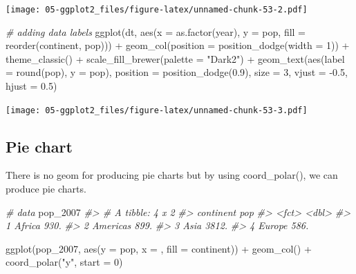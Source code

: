 \documentclass[
]{book}
\newenvironment{Shaded}{\begin{snugshade}}{\end{snugshade}}
\newcommand{\AttributeTok}[1]{\textcolor[rgb]{0.77,0.63,0.00}{#1}}
\newcommand{\CommentTok}[1]{\textcolor[rgb]{0.56,0.35,0.01}{\textit{#1}}}
\newcommand{\DecValTok}[1]{\textcolor[rgb]{0.00,0.00,0.81}{#1}}
\newcommand{\FloatTok}[1]{\textcolor[rgb]{0.00,0.00,0.81}{#1}}
\newcommand{\FunctionTok}[1]{\textcolor[rgb]{0.00,0.00,0.00}{#1}}
\newcommand{\NormalTok}[1]{#1}
\newcommand{\SpecialCharTok}[1]{\textcolor[rgb]{0.00,0.00,0.00}{#1}}
\newcommand{\StringTok}[1]{\textcolor[rgb]{0.31,0.60,0.02}{#1}}
\begin{document}
\texttt{[image: 05-ggplot2\_files/figure-latex/unnamed-chunk-53-2.pdf]}

\begin{Shaded}
\begin{Highlighting}[]


\CommentTok{\# adding data labels}
\FunctionTok{ggplot}\NormalTok{(dt, }\FunctionTok{aes}\NormalTok{(}\AttributeTok{x =} \FunctionTok{as.factor}\NormalTok{(year), }\AttributeTok{y =}\NormalTok{ pop, }\AttributeTok{fill =} \FunctionTok{reorder}\NormalTok{(continent, pop))) }\SpecialCharTok{+} 
   \FunctionTok{geom\_col}\NormalTok{(}\AttributeTok{position =} \FunctionTok{position\_dodge}\NormalTok{(}\AttributeTok{width =} \DecValTok{1}\NormalTok{)) }\SpecialCharTok{+}
   \FunctionTok{theme\_classic}\NormalTok{() }\SpecialCharTok{+}
   \FunctionTok{scale\_fill\_brewer}\NormalTok{(}\AttributeTok{palette =} \StringTok{"Dark2"}\NormalTok{) }\SpecialCharTok{+}
   \FunctionTok{geom\_text}\NormalTok{(}\FunctionTok{aes}\NormalTok{(}\AttributeTok{label =} \FunctionTok{round}\NormalTok{(pop), }\AttributeTok{y =}\NormalTok{ pop), }\AttributeTok{position =} \FunctionTok{position\_dodge}\NormalTok{(}\FloatTok{0.9}\NormalTok{), }
             \AttributeTok{size =} \DecValTok{3}\NormalTok{, }\AttributeTok{vjust =} \SpecialCharTok{{-}}\FloatTok{0.5}\NormalTok{, }\AttributeTok{hjust =} \FloatTok{0.5}\NormalTok{)}
\end{Highlighting}
\end{Shaded}

\texttt{[image: 05-ggplot2\_files/figure-latex/unnamed-chunk-53-3.pdf]}

\hypertarget{pie-chart}{%
\subsection{Pie chart}\label{pie-chart}}

There is no geom for producing pie charts but by using coord\_polar(), we can produce pie charts.

\begin{Shaded}
\begin{Highlighting}[]
\CommentTok{\# data}
\NormalTok{pop\_2007}
\CommentTok{\#\textgreater{} \# A tibble: 4 x 2}
\CommentTok{\#\textgreater{}   continent   pop}
\CommentTok{\#\textgreater{}   \textless{}fct\textgreater{}     \textless{}dbl\textgreater{}}
\CommentTok{\#\textgreater{} 1 Africa     930.}
\CommentTok{\#\textgreater{} 2 Americas   899.}
\CommentTok{\#\textgreater{} 3 Asia      3812.}
\CommentTok{\#\textgreater{} 4 Europe     586.}

\FunctionTok{ggplot}\NormalTok{(pop\_2007, }\FunctionTok{aes}\NormalTok{(}\AttributeTok{y =}\NormalTok{ pop, }\AttributeTok{x =} \StringTok{\textquotesingle{}\textquotesingle{}}\NormalTok{, }\AttributeTok{fill =}\NormalTok{ continent)) }\SpecialCharTok{+} 
   \FunctionTok{geom\_col}\NormalTok{() }\SpecialCharTok{+}
   \FunctionTok{coord\_polar}\NormalTok{(}\StringTok{"y"}\NormalTok{, }\AttributeTok{start =} \DecValTok{0}\NormalTok{)}
\end{Highlighting}
\end{Shaded}
\end{document}
